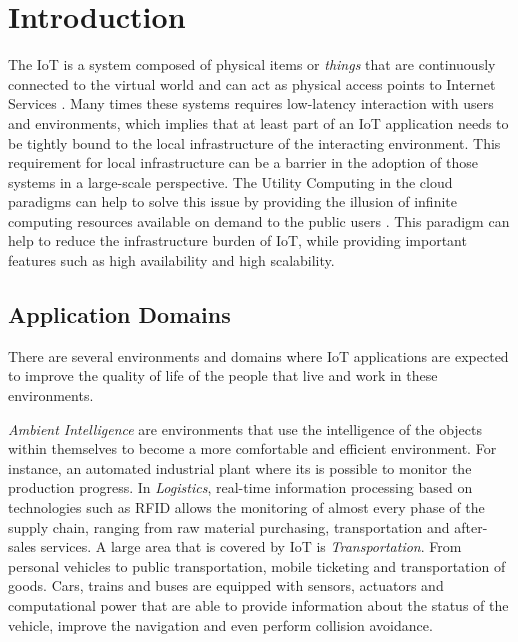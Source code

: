 

\section{Introduction}
\label{sec:introduction}
The \gls{IoT} is a system composed of physical items or \textit{things} that are continuously
connected to the virtual world and can act as physical access points to Internet Services \cite{mattern2010internet}.
Many times these systems requires low-latency interaction with users and environments, which implies
that at least part of an \gls{IoT} application needs to be tightly bound to the local infrastructure
of the interacting environment. This requirement for local infrastructure can be a barrier in the
adoption of those systems in a large-scale perspective. The Utility Computing in the cloud paradigms
can help to solve this issue by providing the illusion of infinite computing resources available on
demand to the public users \cite{armbrust2010view}. This paradigm can help to reduce the infrastructure
burden of \gls{IoT}, while providing important features such as high availability and high scalability.

\subsection{Application Domains}
\label{sub:application_domains}
There are several environments and domains where \gls{IoT} applications are expected
to improve the quality of life of the people that live and work in these environments.

\textit{Ambient Intelligence} are environments that use the intelligence of the objects within
themselves to become a more comfortable and efficient environment. For instance, an automated industrial
plant where its is possible to monitor the production progress.
In \textit{Logistics}, real-time information processing based on technologies such as \gls{RFID} allows the
monitoring of almost every phase of the supply chain, ranging from raw material purchasing, transportation
and after-sales services.
A large area that is covered by \gls{IoT} is \textit{Transportation}. From personal vehicles to public
transportation, mobile ticketing and transportation of goods. Cars, trains and buses are equipped with
sensors, actuators and computational power that are able to provide information about the status of
the vehicle, improve the navigation and even perform collision avoidance.

